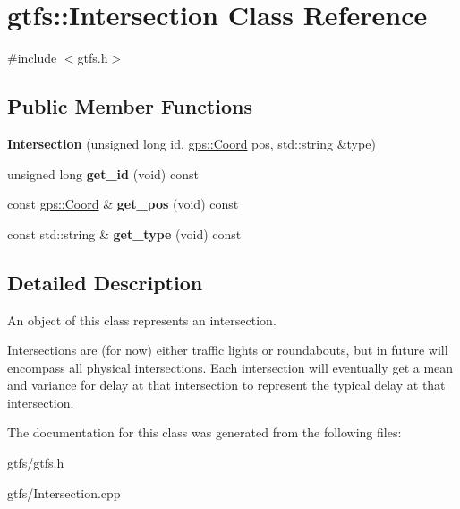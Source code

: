 \hypertarget{classgtfs_1_1Intersection}{}\section{gtfs\+:\+:Intersection Class Reference}
\label{classgtfs_1_1Intersection}


{\ttfamily \#include $<$gtfs.\+h$>$}

\subsection*{Public Member Functions}
\begin{DoxyCompactItemize}
\item 
\mbox{\label{classgtfs_1_1Intersection_aebd20bc7b35c2efd04790946b0f70018}} 
{\bfseries Intersection} (unsigned long id, \hyperlink{classgps_1_1Coord}{gps\+::\+Coord} pos, std\+::string \&type)
\item 
\mbox{\label{classgtfs_1_1Intersection_abd0ff339d61409654a193b17f99e6ebe}} 
unsigned long {\bfseries get\+\_\+id} (void) const
\item 
\mbox{\label{classgtfs_1_1Intersection_a64931f9bdb1c3318174f8fbf9bac02e5}} 
const \hyperlink{classgps_1_1Coord}{gps\+::\+Coord} \& {\bfseries get\+\_\+pos} (void) const
\item 
\mbox{\label{classgtfs_1_1Intersection_a1a38dd499e5860bc4464366e7b845260}} 
const std\+::string \& {\bfseries get\+\_\+type} (void) const
\end{DoxyCompactItemize}


\subsection{Detailed Description}
An object of this class represents an intersection.

Intersections are (for now) either traffic lights or roundabouts, but in future will encompass all physical intersections. Each intersection will eventually get a mean and variance for delay at that intersection to represent the typical delay at that intersection. 

The documentation for this class was generated from the following files\+:\begin{DoxyCompactItemize}
\item 
gtfs/gtfs.\+h\item 
gtfs/Intersection.\+cpp\end{DoxyCompactItemize}
